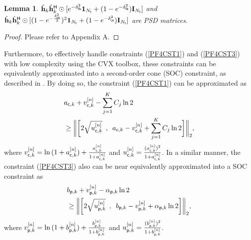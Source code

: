 \documentclass[draftclsnofoot, onecolumn, comsoc, 12pt]{IEEEtran}
\newtheorem{lemma}{Lemma}
\begin{document}
\begin{lemma}
$\hat{\mathbf{h}}_{k} \hat{\mathbf{h}}_{k}^{\sf{H}} \odot
    [e^{-\delta_{\sf{fb}}^{2}}\mathbf{1}_{N_{{\sf{t}}}} + (1-e^{-\delta_{\sf{fb}}^{2}})\mathbf{I}_{N_{{\sf{t}}}}]$ and $\hat{\mathbf{h}}_{k} \hat{\mathbf{h}}_{k}^{\sf{H}} \odot
    [(1-e^{-\frac{\delta_{\sf{ce}}^{2}}{2}})^{2}\mathbf{1}_{N_{{\sf{t}}}} + (1-e^{-\delta_{\sf{ce}}^{2}})\mathbf{I}_{N_{{\sf{t}}}}]$ are PSD matrices.
\end{lemma}
\begin{proof}
    {Please refer to Appendix A.} 
\end{proof}
Furthermore, to effectively handle constraints (\ref{PF4CST1}) and (\ref{PF4CST3}) with low complexity using the CVX toolbox, these constraints can be equivalently approximated into a second-order cone (SOC) constraint, as described in \cite{yin2022rate}. 
By doing so, the constraint (\ref{PF4CST1}) can be approximated as
\begin{align}
    \label{C_SOC_Eq}
    & a_{{\sf{c}},k} + v_{{\sf{c}},k}^{[n]} - \sum_{j=1}^{K}{C_{j}\ln{2}}
    \nonumber \\ 
    & \geq \bigg \Vert \bigg[ 2 \sqrt{u_{{\sf{c}},k}^{[n]}} \,\,\, , \,\,\, a_{{\sf{c}},k}-v_{{\sf{c}},k}^{[n]} + \sum_{j=1}^{K}{C_{j}\ln{2}} \bigg] \bigg \Vert_{2}, 
\end{align}
where $v_{{\sf{c}},k}^{[n]} = \ln{(1 + a_{{\sf{c}},k}^{[n]})} + \frac{a_{{\sf{c}},k}^{[n]}}{1+a_{{\sf{c}},k}^{[n]}}$ and 
$u_{{\sf{c}},k}^{[n]} = \frac{(a_{{\sf{c}},k}^{[n]})^2}{1+a_{{\sf{c}},k}^{[n]}}$. 
In a similar manner, the constraint (\ref{PF4CST3}) also can be near equivalently approximated into a SOC constraint as
\begin{align}
    \label{P_SOC_Eq}
    & b_{{\sf{p}},k} + v_{{\sf{p}},k}^{[n]} - \alpha_{{\sf{p}},k} \ln{2}
    \nonumber \\
    & \geq \bigg \Vert \bigg[ 2 \sqrt{u_{{\sf{p}},k}^{[n]}} \,\,\, , \,\,\, b_{{\sf{p}},k}-v_{{\sf{p}},k}^{[n]} + \alpha_{{\sf{p}},k}\ln{2} \bigg] \bigg \Vert_{2},
\end{align}
where $v_{{\sf{p}},k}^{[n]} = \ln{(1 + b_{{\sf{p}},k}^{[n]})} + \frac{b_{{\sf{p}},k}^{[n]}}{1+b_{{\sf{p}},k}^{[n]}}$
and $u_{{\sf{p}},k}^{[n]} = \frac{(b_{{\sf{p}},k}^{[n]})^2}{1+b_{{\sf{p}},k}^{[n]}}$.
\end{document}
